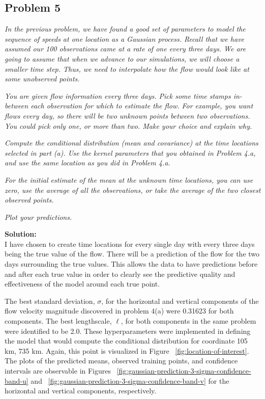 \documentclass[11pt]{article}
\newcommand{\question}[1]{\textit{#1}}
\begin{document}
\subsection{Problem 5}

\question{In the previous problem, we have found a good set of parameters to model the sequence of speeds at one location as a Gaussian process. Recall that we have assumed our 100 observations came at a rate of one every three days. We are going to assume that when we advance to our simulations, we will choose a smaller time step. Thus, we need to interpolate how the flow would look like at some unobserved points.
}

\question{You are given flow information every three days. Pick some time stamps in-between each observation for which to estimate the flow. For example, you want flows every day, so there will be two unknown points between two observations. You could pick only one, or more than two. Make your choice and explain why.}

\question{Compute the conditional distribution (mean and covariance) at the time locations selected in part (a). Use the kernel parameters that you obtained in Problem 4.a, and use the same location as you did in Problem 4.a.}

\question{For the initial estimate of the mean at the unknown time locations, you can use zero, use the average of all the observations, or take the average of the two closest observed points.}

\question{Plot your predictions.}

\textbf{Solution:} \\
I have chosen to create time locations for every single day with every three days being the true value of the flow. There will be a prediction of the flow for the two days surrounding the true values. This allows the data to have predictions before and after each true value in order to clearly see the predictive quality and effectiveness of the model around each true point. 

The best standard deviation, $\sigma$, for the horizontal and vertical components of the flow velocity magnitude discovered in problem 4(a) were 0.31623 for both components. The best lengthscale, $\ell$, for both components in the same problem were identified to be 2.0. These hyperparameters were implemented in defining the model that would compute the conditional distribution for coordinate 105 km, 735 km. Again, this point is visualized in Figure ~\ref{fig:location-of-interest}. The plots of the predicted means, observed training points, and confidence intervals are observable in Figures ~\ref{fig:gaussian-prediction-3-sigma-confidence-band-u} and ~\ref{fig:gaussian-prediction-3-sigma-confidence-band-v} for the horizontal and vertical components, respectively.
\end{document}
